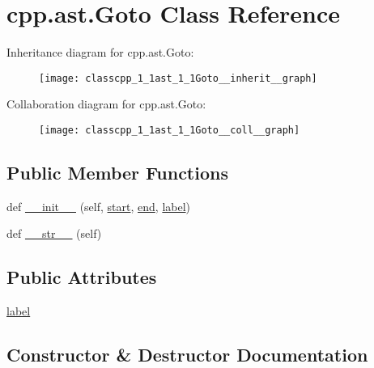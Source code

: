 \hypertarget{classcpp_1_1ast_1_1Goto}{}\section{cpp.\+ast.\+Goto Class Reference}
\label{classcpp_1_1ast_1_1Goto}


Inheritance diagram for cpp.\+ast.\+Goto\+:
\nopagebreak
\begin{figure}[H]
\begin{center}
\leavevmode
\texttt{[image: classcpp\_1\_1ast\_1\_1Goto\_\_inherit\_\_graph]}
\end{center}
\end{figure}


Collaboration diagram for cpp.\+ast.\+Goto\+:
\nopagebreak
\begin{figure}[H]
\begin{center}
\leavevmode
\texttt{[image: classcpp\_1\_1ast\_1\_1Goto\_\_coll\_\_graph]}
\end{center}
\end{figure}
\subsection*{Public Member Functions}
\begin{DoxyCompactItemize}
\item 
def \hyperlink{classcpp_1_1ast_1_1Goto_a928e79374a90d01fc060985ea1e45260}{\+\_\+\+\_\+init\+\_\+\+\_\+} (self, \hyperlink{classcpp_1_1ast_1_1Node_a7b2aa97e6a049bb1a93aea48c48f1f44}{start}, \hyperlink{classcpp_1_1ast_1_1Node_a3c5e5246ccf619df28eca02e29d69647}{end}, \hyperlink{classcpp_1_1ast_1_1Goto_a685284ea5f3b21f39aff7f5db841c8f5}{label})
\item 
def \hyperlink{classcpp_1_1ast_1_1Goto_a508b6bc091cf06bfed73a33368c236c9}{\+\_\+\+\_\+str\+\_\+\+\_\+} (self)
\end{DoxyCompactItemize}
\subsection*{Public Attributes}
\begin{DoxyCompactItemize}
\item 
\hyperlink{classcpp_1_1ast_1_1Goto_a685284ea5f3b21f39aff7f5db841c8f5}{label}
\end{DoxyCompactItemize}


\subsection{Constructor \& Destructor Documentation}
